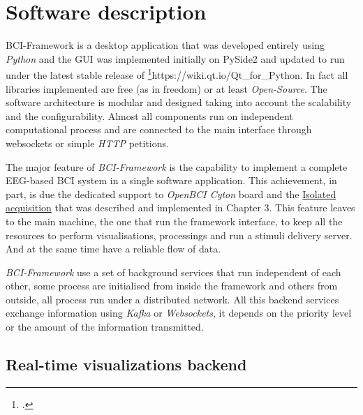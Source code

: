 \section{Software description}

BCI-Framework is a desktop application that was developed entirely using \textit{Python} and the \gls*{GUI} was implemented initially on PySide2 and updated to run under the latest stable release of \footcite{PySide6}{https://wiki.qt.io/Qt\_for\_Python}. In fact all libraries implemented are free (as in freedom) or at least \textit{Open-Source}. The software architecture is modular and designed taking into account the scalability and the configurability. Almost all components run on independent computational process and are connected to the main interface through websockets or simple \textit{HTTP} petitions.

The major feature of \textit{BCI-Framework} is the capability to implement a complete EEG-based BCI system in a single software application. This achievement, in part, is due the dedicated support to \textit{OpenBCI Cyton} board and the \hyperref[chap3:isolated-acquisition]{Isolated acquisition} that was described and implemented in Chapter 3. This feature leaves to the main machine, the one that run the framework interface, to keep all the resources to perform visualisations, processings and run a stimuli delivery server. And at the same time have a reliable flow of data.

\textit{BCI-Framework} use a set of background services that run independent of each other, some process are initialised from inside the framework and others from outside, all process run under a distributed network. All this backend services exchange information using \textit{Kafka} or \textit{Websockets}, it depends on the priority level or the amount of the information transmitted. 



\subsection{Real-time visualizations backend}\label{ch4:realtime_visualizations_backend}

